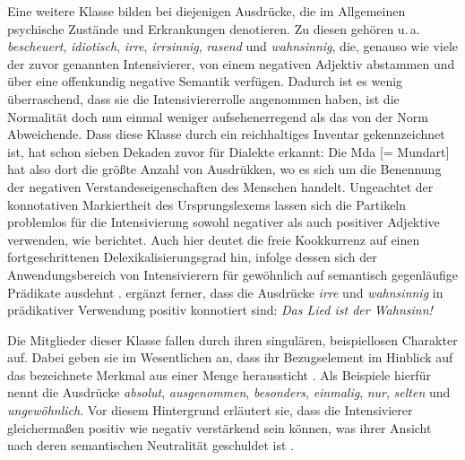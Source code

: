 Eine weitere Klasse bilden bei {\citet[358]{Claudi.2006}} diejenigen Ausdrücke, die im Allgemeinen psychische Zustände und Erkrankungen denotieren. Zu diesen gehören u.\,a. \textit{bescheuert}, \textit{idiotisch}, \textit{irre}, \textit{irrsinnig}, \textit{rasend} und \textit{wahnsinnig}, die, genauso wie viele der zuvor genannten Intensivierer, von einem negativen Adjektiv abstammen und über eine offenkundig negative Semantik verfügen. Dadurch ist es wenig überraschend, dass sie die Intensiviererrolle angenommen haben, ist die Normalität doch nun einmal weniger aufsehenerregend als das von der Norm Abweichende. Dass diese Klasse durch ein reichhaltiges Inventar gekennzeichnet ist, hat schon \citet[275]{Bach.1950} sieben Dekaden zuvor für Dialekte erkannt: \glqq{}Die Mda [= Mundart] hat also dort die größte Anzahl von Ausdrükken, wo es sich um die Benennung der negativen Verstandeseigenschaften des Menschen handelt.\grqq{} Ungeachtet der konnotativen Markiertheit des Ursprungslexems lassen sich die Partikeln problemlos für die Intensivierung sowohl negativer als auch positiver Adjektive verwenden, wie \citet[358]{Claudi.2006} berichtet. Auch hier deutet die freie Kookkurrenz auf einen fortgeschrittenen Delexikalisierungsgrad hin, infolge dessen sich der Anwendungsbereich von Intensivierern für gewöhnlich auf semantisch gegenläufige Prädikate ausdehnt \citep[vgl.][284]{Tagliamonte.2005}. {\citet[358]{Claudi.2006}} ergänzt ferner, dass die Ausdrücke \textit{irre} und \textit{wahnsinnig} in prädikativer Verwendung positiv konnotiert sind: \textit{Das Lied ist der Wahnsinn!}


Die Mitglieder dieser Klasse fallen durch ihren singulären, beispiellosen Charakter auf. Dabei geben sie im Wesentlichen an, dass ihr Bezugselement im Hinblick auf das bezeichnete Merkmal aus einer Menge heraussticht \citep[vgl.][358]{Claudi.2006}. Als Beispiele hierfür nennt {\citet[358]{Claudi.2006}} die Ausdrücke \textit{absolut}, \textit{ausgenommen}, \textit{besonders}, \textit{einmalig}, \textit{nur}, \textit{selten} und \textit{ungewöhnlich}. Vor diesem Hintergrund erläutert sie, dass die Intensivierer gleichermaßen positiv wie negativ verstärkend sein können, was ihrer Ansicht nach deren semantischen Neutralität geschuldet ist \citep[vgl.][358]{Claudi.2006}.


